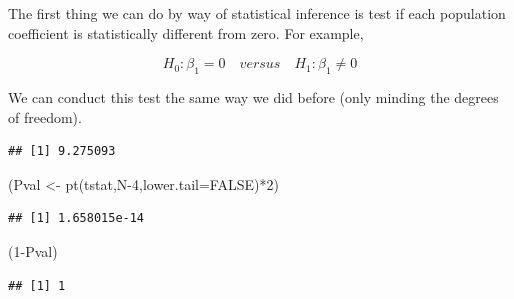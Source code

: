 \documentclass[
]{book}
\newenvironment{Shaded}{\begin{snugshade}}{\end{snugshade}}
\newcommand{\AttributeTok}[1]{\textcolor[rgb]{0.77,0.63,0.00}{#1}}
\newcommand{\ConstantTok}[1]{\textcolor[rgb]{0.00,0.00,0.00}{#1}}
\newcommand{\DecValTok}[1]{\textcolor[rgb]{0.00,0.00,0.81}{#1}}
\newcommand{\FunctionTok}[1]{\textcolor[rgb]{0.00,0.00,0.00}{#1}}
\newcommand{\NormalTok}[1]{#1}
\newcommand{\OtherTok}[1]{\textcolor[rgb]{0.56,0.35,0.01}{#1}}
\newcommand{\SpecialCharTok}[1]{\textcolor[rgb]{0.00,0.00,0.00}{#1}}
\begin{document}
The first thing we can do by way of statistical inference is test if each population coefficient is statistically different from zero. For example,

\[H_0: \beta_1 = 0 \quad versus \quad H_1:\beta_1 \neq 0\]

We can conduct this test the same way we did before (only minding the degrees of freedom).

\begin{Shaded}
\end{Shaded}

\begin{verbatim}
## [1] 9.275093
\end{verbatim}

\begin{Shaded}
\begin{Highlighting}[]
\NormalTok{(Pval }\OtherTok{\textless{}{-}} \FunctionTok{pt}\NormalTok{(tstat,N}\DecValTok{{-}4}\NormalTok{,}\AttributeTok{lower.tail=}\ConstantTok{FALSE}\NormalTok{)}\SpecialCharTok{*}\DecValTok{2}\NormalTok{)}
\end{Highlighting}
\end{Shaded}

\begin{verbatim}
## [1] 1.658015e-14
\end{verbatim}

\begin{Shaded}
\begin{Highlighting}[]
\NormalTok{(}\DecValTok{1}\SpecialCharTok{{-}}\NormalTok{Pval)}
\end{Highlighting}
\end{Shaded}

\begin{verbatim}
## [1] 1
\end{verbatim}
\end{document}

